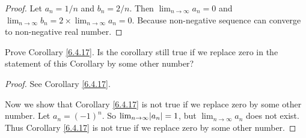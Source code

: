 \begin{proof}
Let \(a_n = 1 / n\) and \(b_n = 2 / n\).
Then \(\lim_{n \to \infty} a_n = 0\) and \(\lim_{n \to \infty} b_n = 2 \times \lim_{n \to \infty} a_n = 0\).
Because non-negative sequence can converge to non-negative real number.
\end{proof}

\begin{exercise}\label{ex 6.4.7}
Prove Corollary \ref{6.4.17}.
Is the corollary still true if we replace zero in the statement of this Corollary by some other number?
\end{exercise}

\begin{proof}
See Corollary \ref{6.4.17}.

Now we show that Corollary \ref{6.4.17} is not true if we replace zero by some other number.
Let \(a_n = (-1)^n\).
So \(\lim_{n \to \infty} \abs*{a_n} = 1\), but \(\lim_{n \to \infty} a_n\) does not exist.
Thus Corollary \ref{6.4.17} is not true if we replace zero by some other number.
\end{proof}